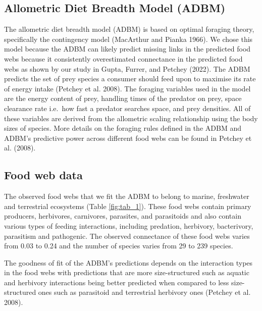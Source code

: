 \documentclass{article}
\begin{document}
\hypertarget{allometric-diet-breadth-model-adbm}{%
\subsection{Allometric Diet Breadth Model
(ADBM)}\label{allometric-diet-breadth-model-adbm}}

The allometric diet breadth model (ADBM) is based on optimal foraging
theory, specifically the contingency model (MacArthur and Pianka 1966).
We chose this model because the ADBM can likely predict missing links in
the predicted food webs because it consistently overestimated
connectance in the predicted food webs as shown by our study in Gupta,
Furrer, and Petchey (2022). The ADBM predicts the set of prey species a
consumer should feed upon to maximise its rate of energy intake (Petchey
et al. 2008). The foraging variables used in the model are the energy
content of prey, handling times of the predator on prey, space clearance
rate i.e.~how fast a predator searches space, and prey densities. All of
these variables are derived from the allometric scaling relationship
using the body sizes of species. More details on the foraging rules
defined in the ADBM and ADBM's predictive power across different food
webs can be found in Petchey et al. (2008).

\hypertarget{food-web-data}{%
\subsection{Food web data}\label{food-web-data}}

The observed food webs that we fit the ADBM to belong to marine,
freshwater and terrestrial ecosystems (Table \ref{fig:tab_1}). These
food webs contain primary producers, herbivores, carnivores, parasites,
and parasitoids and also contain various types of feeding interactions,
including predation, herbivory, bacterivory, parasitism and pathogenic.
The observed connectance of these food webs varies from 0.03 to 0.24 and
the number of species varies from 29 to 239 species.

The goodness of fit of the ADBM's predictions depends on the interaction
types in the food webs with predictions that are more size-structured
such as aquatic and herbivory interactions being better predicted when
compared to less size-structured ones such as parasitoid and terrestrial
herbivory ones (Petchey et al. 2008).
\end{document}
